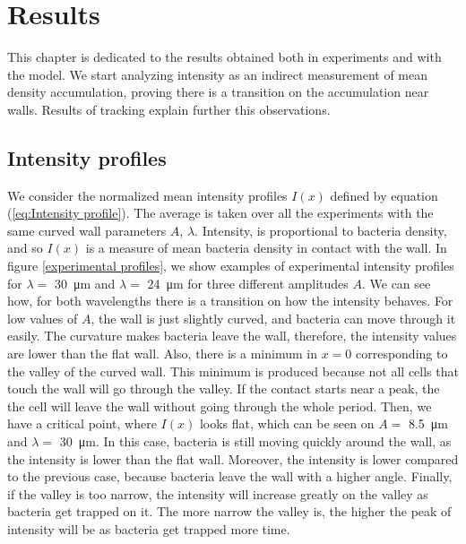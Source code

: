 \chapter{Results}

This chapter is dedicated to the results obtained both in experiments and with the model. We start analyzing intensity as an indirect measurement of mean density accumulation, proving there is a transition on the accumulation near walls. Results of tracking explain further this observations.  

\section{Intensity profiles}


We consider the normalized mean intensity profiles $I(x)$ defined by equation (\ref{eq:Intensity profile}). The average is taken over all the experiments with the same curved wall parameters $A$, $\lambda$. Intensity, is proportional to bacteria density, and so $I(x)$ is a measure of mean bacteria density in contact with the wall. In figure \ref{experimental profiles}, we show examples of experimental intensity profiles for $\lambda=$ \SI{30}{\micro\meter} and $\lambda= $ \SI{24}{\micro\meter} for three different amplitudes $A$. We can see how, for both wavelengths there is a transition on how the intensity behaves. For low values of $A$, the wall is just slightly curved, and bacteria can move through it easily. The curvature makes bacteria leave the wall, therefore, the intensity values are lower than the flat wall. Also, there is a minimum in $x=0$ corresponding to the valley of the curved wall. This minimum is produced because not all cells that touch the wall will go through the valley. If the contact starts near a peak, the the cell will leave the wall without going through the whole period. Then, we have a critical point, where $I(x)$ looks flat, which can be seen on $A=$ \SI{8.5}{\micro\meter} and $\lambda= $ \SI{30}{\micro\meter}. In this case, bacteria is still moving quickly around the wall, as the intensity is lower than the flat wall. Moreover, the intensity is lower compared to the previous case, because bacteria leave the wall with a higher angle. Finally, if the valley is too narrow, the intensity will increase greatly on the valley as bacteria get trapped on it. The more narrow the valley is, the higher the peak of intensity will be as bacteria get trapped more time.

